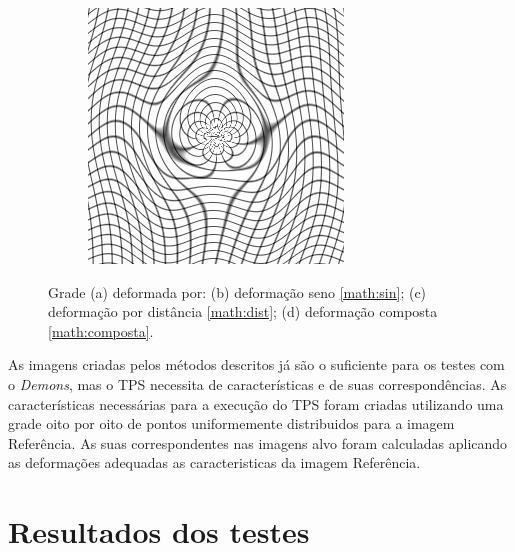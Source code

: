 \begin{figure}[H]
\begin{subfigure}[t]{0.3\textwidth}
	  \label{fig:sin-image}
	\end{subfigure}
	\begin{subfigure}[t]{0.3\textwidth}
	  \includegraphics[width=\textwidth]{figuras/movingImageDistSin.png}
	  \label{fig:dist-image}
	\end{subfigure}
	\caption{Grade (a) deformada por: (b) deformação seno \ref{math:sin}; (c) deformação por distância \ref{math:dist}; 
				(d) deformação composta \ref{math:composta}. }
	\label{fig:deformacoes}
\end{figure}

	As imagens criadas pelos métodos descritos já são o suficiente para os testes com o \textit{Demons}, mas o TPS
necessita de características e de suas correspondências. As características necessárias para a execução do TPS foram 
criadas utilizando uma grade oito por oito de pontos uniformemente distribuidos para a imagem Referência. As suas 
correspondentes nas imagens alvo foram calculadas aplicando as deformações adequadas as caracteristicas da imagem 
Referência.

\section{Resultados dos testes}

